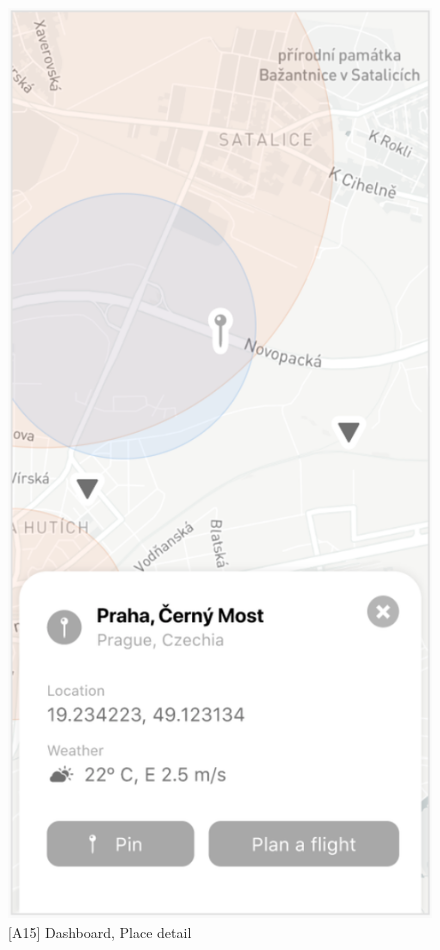 \begin{figure}
    \centering
    \begin{minipage}{.45\textwidth}
        \centering
        \includegraphics[width=.7\linewidth]{assets/user_interface_design/dashboard/dashboard_place_detail.png}
        \caption{[A15] Dashboard, Place detail}
        \label{fig:dashboard_place_detail}
    \end{minipage}%
    \hspace{.05\linewidth}
    \begin{minipage}{.45\textwidth}
        \centering

\end{minipage}
\end{figure}
